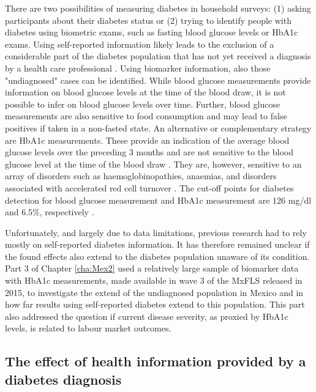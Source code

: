 There are two possibilities of measuring diabetes in household surveys: (1) asking participants about their diabetes status or (2) trying to identify people with diabetes using biometric exams, such as fasting blood glucose levels or \ac{HbA1c} exams. Using self-reported information likely leads to the exclusion of a considerable part of the diabetes population that has not yet received a diagnosis by a health care professional \parencite{Beagley2014}. Using biomarker information, also those "undiagnosed" cases can be identified. While blood glucose measurements provide information on blood glucose levels at the time of the blood draw, it is not possible to infer on blood glucose levels over time. Further, blood glucose measurements are also sensitive to food consumption and may lead to false positives if taken in a non-fasted state. An alternative or complementary strategy are \ac{HbA1c} measurements. These provide an indication of the average blood glucose levels over the preceding 3 months and are not sensitive to the blood glucose level at the time of the blood draw \parencite{WorldHealthOrganization2011}. They are, however, sensitive to an array of disorders such as haemoglobinopathies, anaemias, and disorders associated with accelerated red cell turnover \parencite{WorldHealthOrganization2011}. The cut-off points for diabetes detection for blood glucose measurement and \ac{HbA1c} measurement are 126 mg/dl and 6.5\%, respectively \parencite{WorldHealthOrganization2006,WorldHealthOrganization2011}.

Unfortunately, and largely due to data limitations, previous research had to rely mostly on self-reported diabetes information. It has therefore remained unclear if the found effects also extend to the diabetes population unaware of its condition. Part 3 of Chapter \ref{cha:Mex2} used a relatively large sample of biomarker data with \ac{HbA1c} measurements, made available in wave 3 of the \ac{MxFLS} released in 2015, to investigate the extend of the undiagnosed population in Mexico and in how far results using self-reported diabetes extend to this population. This part also addressed the question if current disease severity, as proxied by \ac{HbA1c} levels, is related to labour market outcomes.

\subsection{The effect of health information provided by a diabetes diagnosis}

